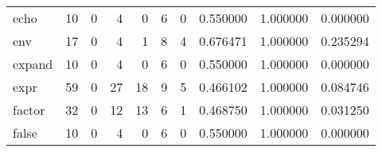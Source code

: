 \begin{longtable}{lrrrrrrrrr}
echo      &                                       10 &                                                  0 &                                                  4 &                                                  0 &                                                  6 &                                                  0 &                                           0.550000 &                               1.000000 &                             0.000000 \\
env       &                                       17 &                                                  0 &                                                  4 &                                                  1 &                                                  8 &                                                  4 &                                           0.676471 &                               1.000000 &                             0.235294 \\
expand    &                                       10 &                                                  0 &                                                  4 &                                                  0 &                                                  6 &                                                  0 &                                           0.550000 &                               1.000000 &                             0.000000 \\
expr      &                                       59 &                                                  0 &                                                 27 &                                                 18 &                                                  9 &                                                  5 &                                           0.466102 &                               1.000000 &                             0.084746 \\
factor    &                                       32 &                                                  0 &                                                 12 &                                                 13 &                                                  6 &                                                  1 &                                           0.468750 &                               1.000000 &                             0.031250 \\
false     &                                       10 &                                                  0 &                                                  4 &                                                  0 &                                                  6 &                                                  0 &                                           0.550000 &                               1.000000 &                             0.000000 \\

\end{longtable}
